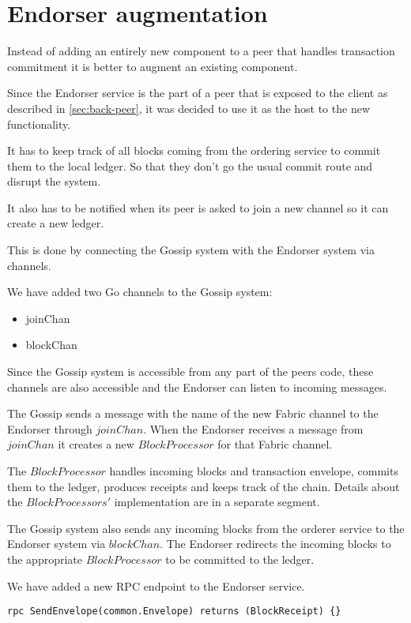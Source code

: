 \section{Endorser augmentation}
\label{sec:augm}
Instead of adding an entirely new component to a peer that handles transaction commitment it is better to augment an existing component.

Since the Endorser service is the part of a peer that is exposed to the client as described in \ref{sec:back-peer}, it was decided to use it as the host to the new functionality.

It has to keep track of all blocks coming from the ordering service to commit them to the local ledger. So that they don't go the usual commit route and disrupt the system.

It also has to be notified when its peer is asked to join a new channel so it can create a new ledger.

This is done by connecting the Gossip system with the Endorser system via channels.

We have added two Go channels to the Gossip system:
\begin{itemize}
  \item joinChan
  \item blockChan
\end{itemize}

Since the Gossip system is accessible from any part of the peers code, these channels are also accessible and the Endorser can listen to incoming messages.

The Gossip sends a message with the name of the new Fabric channel to the Endorser through $joinChan$.
When the Endorser receives a message from $joinChan$ it creates a new $BlockProcessor$ for that Fabric channel.

The $BlockProcessor$ handles incoming blocks and transaction envelope, commits them to the ledger, produces receipts and keeps track of the chain. Details about the $BlockProcessors'$ implementation are in a separate segment.

The Gossip system also sends any incoming blocks from the orderer service to the Endorser system via $blockChan$.
The Endorser redirects the incoming blocks to the appropriate $BlockProcessor$ to be committed to the ledger.

We have added a new RPC endpoint to the Endorser service.

\begin{lstlisting}
rpc SendEnvelope(common.Envelope) returns (BlockReceipt) {}
\end{lstlisting}

